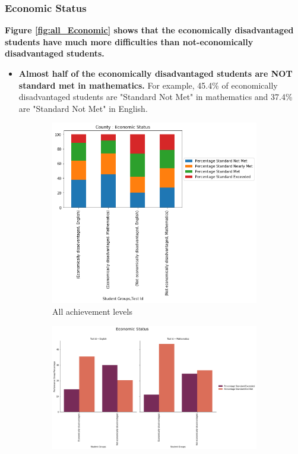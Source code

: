 \documentclass[11pt]{article}
\begin{document}
\subsubsection{Economic Status}
\textbf{Figure \ref{fig:all_Economic} shows that the economically disadvantaged students have much more difficulties than not-economically disadvantaged students.}
\begin{itemize}
	\item \textbf{Almost half of the economically disadvantaged students are NOT standard met in mathematics.} For example, 45.4\% of economically disadvantaged students are "Standard Not Met" in mathematics and 37.4\% are "Standard Not Met" in English. 
\end{itemize}
 
\begin{figure}[h!]
\centering
\begin{subfigure}{0.35\textwidth}
         \centering
         \includegraphics[width=\textwidth]{output_34_0.png}
         \caption{All achievement levels}
         \label{fig:Economic_all}
\end{subfigure}
\hfill
\begin{subfigure}{0.6\textwidth}
         \centering
         \includegraphics[width=\textwidth]{output_35_1.png}

\end{subfigure}
\end{figure}
\end{document}
